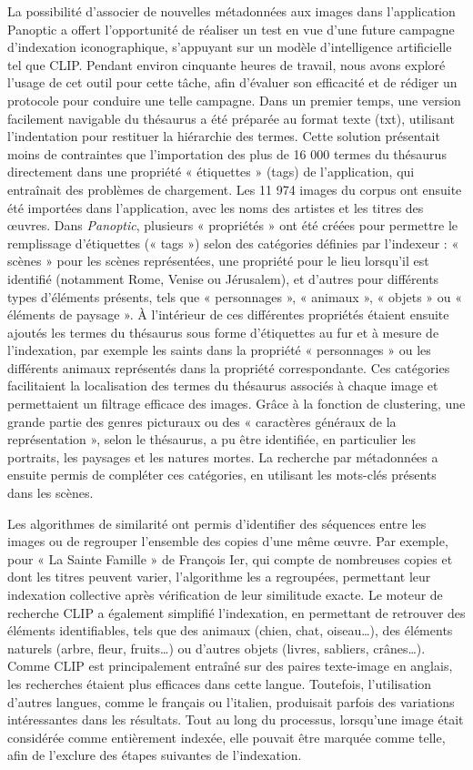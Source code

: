 La possibilité d’associer de nouvelles métadonnées aux images dans l’application Panoptic a offert l’opportunité de réaliser un test en vue d’une future campagne d’indexation iconographique, s’appuyant sur un modèle d’intelligence artificielle tel que CLIP. Pendant environ cinquante heures de travail, nous avons exploré l’usage de cet outil pour cette tâche, afin d’évaluer son efficacité et de rédiger un protocole pour conduire une telle campagne. Dans un premier temps, une version facilement navigable du thésaurus a été préparée au format texte (txt), utilisant l’indentation pour restituer la hiérarchie des termes. Cette solution présentait moins de contraintes que l’importation des plus de 16 000 termes du thésaurus directement dans une propriété « étiquettes » (tags) de l’application, qui entraînait des problèmes de chargement. Les 11 974 images du corpus ont ensuite été importées dans l’application, avec les noms des artistes et les titres des œuvres. Dans \textit{Panoptic}, plusieurs « propriétés » ont été créées pour permettre le remplissage d’étiquettes (« tags ») selon des catégories définies par l’indexeur : « scènes » pour les scènes représentées, une propriété pour le lieu lorsqu’il est identifié (notamment Rome, Venise ou Jérusalem), et d’autres pour différents types d’éléments présents, tels que « personnages », « animaux », « objets » ou « éléments de paysage ». À l’intérieur de ces différentes propriétés étaient ensuite ajoutés les termes du thésaurus sous forme d’étiquettes au fur et à mesure de l’indexation, par exemple les saints dans la propriété « personnages » ou les différents animaux représentés dans la propriété correspondante. Ces catégories facilitaient la localisation des termes du thésaurus associés à chaque image et permettaient un filtrage efficace des images. Grâce à la fonction de clustering, une grande partie des genres picturaux ou des « caractères généraux de la représentation », selon le thésaurus, a pu être identifiée, en particulier les portraits, les paysages et les natures mortes. La recherche par métadonnées a ensuite permis de compléter ces catégories, en utilisant les mots-clés présents dans les scènes. 
	
Les algorithmes de similarité ont permis d’identifier des séquences entre les images ou de regrouper l’ensemble des copies d’une même œuvre. Par exemple, pour « La Sainte Famille » de François Ier, qui compte de nombreuses copies et dont les titres peuvent varier, l’algorithme les a regroupées, permettant leur indexation collective après vérification de leur similitude exacte. Le moteur de recherche CLIP a également simplifié l’indexation, en permettant de retrouver des éléments identifiables, tels que des animaux (chien, chat, oiseau…), des éléments naturels (arbre, fleur, fruits…) ou d’autres objets (livres, sabliers, crânes…). Comme CLIP est principalement entraîné sur des paires texte-image en anglais, les recherches étaient plus efficaces dans cette langue. Toutefois, l’utilisation d’autres langues, comme le français ou l’italien, produisait parfois des variations intéressantes dans les résultats. Tout au long du processus, lorsqu’une image était considérée comme entièrement indexée, elle pouvait être marquée comme telle, afin de l’exclure des étapes suivantes de l’indexation.

